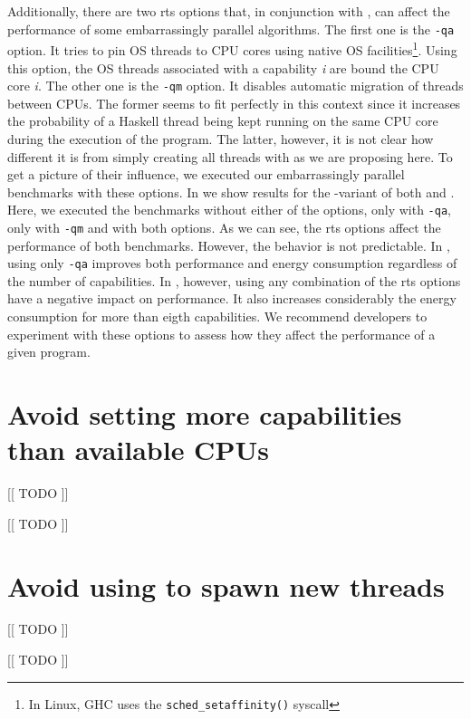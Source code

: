 Additionally, there are two \ac{rts} options that, in conjunction with \forkOn, can affect the performance of some embarrassingly parallel algorithms. The first one is the \texttt{-qa} option. It tries to pin OS threads to CPU cores using native OS facilities\footnote{In Linux, GHC uses the \texttt{sched\_setaffinity()} syscall}. Using this option, the OS threads associated with a capability \emph{i} are bound the CPU core \emph{i}. The other one is the \texttt{-qm} option. It disables automatic migration of threads between CPUs. The former seems to fit perfectly in this context since it increases the probability of a Haskell thread being kept running on the same CPU core during the execution of the program. The latter, however, it is not clear how different it is from simply creating all threads with \forkOn as we are proposing here. To get a picture of their influence, we executed our embarrassingly parallel benchmarks with these options. In  we show results for the \forkOn-\MVar variant of both \regex and \spectral. Here, we executed the benchmarks without either of the options, only with \texttt{-qa}, only with \texttt{-qm} and with both options. As we can see, the \ac{rts} options affect the performance of both benchmarks. However, the behavior is not predictable. In \spectral, using only \texttt{-qa} improves both performance and energy consumption regardless of the number of capabilities. In \regex, however, using any combination of the \ac{rts} options have a negative impact on performance. It also increases considerably the energy consumption for more than eigth capabilities. We recommend developers to experiment with these options to assess how they affect the performance of a given program.


\section{Avoid setting more capabilities than available CPUs}
 [[ TODO ]]
\newline

 [[ TODO ]]


\section{Avoid using \forkOS to spawn new threads}
 [[ TODO ]]
\newline

 [[ TODO ]]
